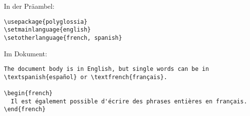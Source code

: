 % 



In der Präambel:
\begin{lstlisting}
\usepackage{polyglossia}
\setmainlanguage{english}
\setotherlanguage{french, spanish}
\end{lstlisting}
Im Dokument:
\begin{lstlisting}
The document body is in English, but single words can be in 
\textspanish{español} or \textfrench{français}.

\begin{french}
  Il est également possible d'écrire des phrases entières en français.
\end{french}
\end{lstlisting}